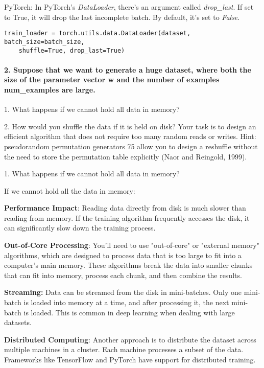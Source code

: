 PyTorch: In PyTorch's \emph{DataLoader}, there's an argument called \emph{drop\_last}.
If set to True, it will drop the last incomplete batch.
By default, it's set to \emph{False}.

\begin{verbatim}
train_loader = torch.utils.data.DataLoader(dataset, batch_size=batch_size,
    shuffle=True, drop_last=True)
\end{verbatim}

\paragraph{2. Suppose that we want to generate a huge dataset, where both the size of the parameter vector w and the number of examples num\_examples are large.}

1. What happens if we cannot hold all data in memory?

2. How would you shuffle the data if it is held on disk? Your task is to design an eﬀicient algorithm that does not require too many random reads or writes.
Hint: pseudorandom permutation generators 75 allow you to design a reshuffle without the need to store the permutation table explicitly (Naor and Reingold, 1999).

1. What happens if we cannot hold all data in memory?

If we cannot hold all the data in memory:

\textbf{Performance Impact}: Reading data directly from disk is much slower than reading from memory. If the training algorithm frequently accesses the disk, it can significantly slow down the training process.

\textbf{Out-of-Core Processing}: You'll need to use "out-of-core" or "external memory" algorithms, which are designed to process data that is too large to fit into a computer's main memory.
These algorithms break the data into smaller chunks that can fit into memory, process each chunk, and then combine the results.

\textbf{Streaming:} Data can be streamed from the disk in mini-batches.
Only one mini-batch is loaded into memory at a time, and after processing it, the next mini-batch is loaded.
This is common in deep learning when dealing with large datasets.

\textbf{Distributed Computing}: Another approach is to distribute the dataset across multiple machines in a cluster.
Each machine processes a subset of the data. Frameworks like TensorFlow and PyTorch have support for distributed training.

